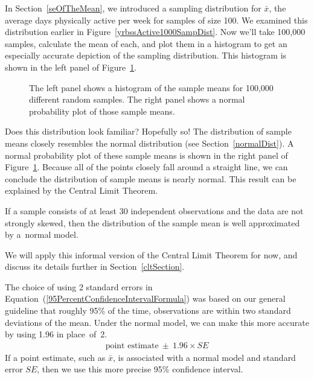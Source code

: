 In Section~\ref{seOfTheMean}, we introduced a sampling distribution for $\bar{x}$, the average days physically active per week for samples of size 100. We examined this distribution earlier in Figure~\ref{yrbssActive1000SampDist}. Now we'll take 100,000 samples, calculate the mean of each, and plot them in a histogram to get an especially accurate depiction of the sampling distribution. This histogram is shown in the left panel of Figure~\ref{yrbssActiveBigSampDist}.

\begin{figure}
   \centering
   \caption{The left panel shows a histogram of the sample means for 100,000 different random samples. The right panel shows a normal probability plot of those sample means.}
   \label{yrbssActiveBigSampDist}
\end{figure}

Does this distribution look familiar? Hopefully so! The distribution of sample means closely resembles the normal distribution (see Section~\ref{normalDist}). A normal probability plot of these sample means is shown in the right panel of Figure~\ref{yrbssActiveBigSampDist}. Because all of the points closely fall around a straight line, we can conclude the distribution of sample means is nearly normal. This result can be explained by the Central Limit Theorem.

\begin{termBox}{
If a sample consists of at least 30 independent observations and the data are not strongly skewed, then the distribution of the sample mean is well approximated by a~normal model.}
\end{termBox}

We will apply this informal version of the Central Limit Theorem for now, and discuss its details further in Section~\ref{cltSection}.

The choice of using 2 standard errors in Equation~(\ref{95PercentConfidenceIntervalFormula}) was based on our general guideline that roughly 95\% of the time, observations are within two standard deviations of the mean. Under the normal model, we can make this more accurate by using 1.96 in place~of~2.
\begin{eqnarray}
\text{point estimate}\ \pm\ 1.96\times SE
\label{95PercentCIWhenUsingNormalModel}
\end{eqnarray}
If a point estimate, such as $\bar{x}$, is associated with a normal model and standard error $SE$, then we use this more precise 95\% confidence interval.


